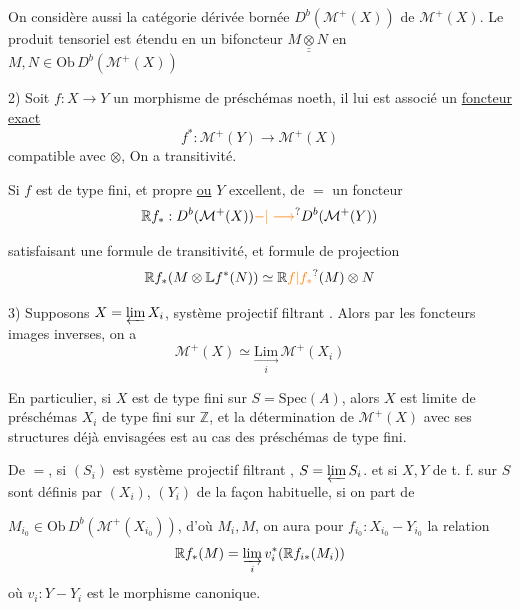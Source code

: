On considère aussi la catégorie dérivée bornée %
$D^b(\mathcal M^+(X))$ de $\mathcal M^+(X)$. Le produit tensoriel est %
étendu en un bifoncteur $M\mathbin{\underline{\underline{\otimes}}}N$ en $M,N\in\mathrm{Ob}\,D^b(\mathcal M^+(X))$ %

2) Soit $f:X\longrightarrow Y$ un morphisme de préschémas %
 noeth, il lui est associé un \uline{foncteur} %
\uline{exact} %
\[
f^*:\mathcal M^+(Y)\longrightarrow\mathcal M^+(X) %
\]
compatible avec $\otimes$,  On a transitivité. %

Si $f$ est de type fini, et propre \uline{ou} $Y$ excellent, %
  de $=$ un foncteur %
\[
\mathbb R f_*:D^b(\mathcal M^+(X))\unsure{-|\longrightarrow}D^b(\mathcal M^+(Y)) %
\]

satisfaisant une formule de transitivité, %
et formule de projection %
\[
\mathbb R f_*(M\otimes\mathbb L f^*(N))\simeq\mathbb R \unsure{f|f_*}(M)\otimes N %
\]

3) Supposons $X=\varprojlim X_i$, système projectif %
filtrant . Alors par les foncteurs %
images inverses, on a %
\[
\mathcal M^+(X)\simeq\underset{i}{\underset{\longrightarrow}{\mathrm{Lim}}}\,\mathcal M^+(X_i) %
\]

En particulier, si $X$ est de type fini %
sur $S=\mathrm{Spec}(A)$, alors $X$ est limite de %
préschémas $X_i$ de type fini sur $\mathbb Z$, et %
la détermination de $\mathcal M^+(X)$ avec ses %
structures déjà envisagées est   %
au cas des préschémas de type fini. %

De $=$, si $(S_i)$ est système %
projectif filtrant , $S=\varprojlim S_i$. %
et si $X,Y$ de t. f. sur $S$ sont %
définis par $(X_i)$, $(Y_i)$ de la %
façon habituelle, si on part de %

$M_{i_0}\in\mathrm{Ob}\,D^b(\mathcal M^+(X_{i_0}))$, d'où $M_i,M$, on %
aura pour $f_{i_0}:X_{i_0}-Y_{i_0}$ la relation %
\[
\mathbb R f_*(M)=\varinjlim_i v_i^*(\mathbb R f_{i*}(M_i)) %
\]
où $v_i:Y-Y_i$ est le morphisme %
canonique. %

